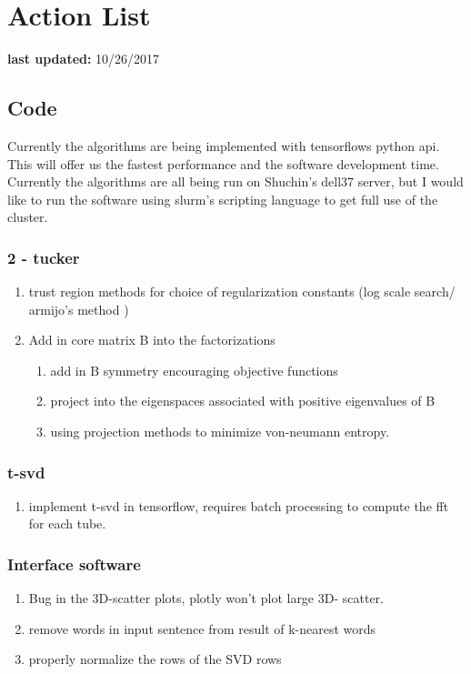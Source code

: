 \documentclass{report}
\begin{document}
\section{Action List}
	\textbf{last updated:} 10/26/2017
	\subsection{Code}
		Currently the algorithms are being implemented with tensorflows python api. This will offer us the fastest performance and the software development time. Currently the algorithms are all being run on Shuchin's dell37 server, but I would like to run the software using slurm's scripting language to get full use of the cluster. 
		\subsubsection{2 - tucker}
			\begin{enumerate}
				\item trust region methods for choice of regularization constants (log scale search/ armijo's method )
				\item Add in core matrix B into the factorizations
				\begin{enumerate}
					\item add in B symmetry encouraging objective functions
					\item project into the eigenspaces associated with positive eigenvalues of B
					\item using projection methods to minimize von-neumann entropy. 
				\end{enumerate}
			\end{enumerate}
		\subsubsection{t-svd}
			\begin{enumerate}
				\item implement t-svd in tensorflow, requires batch processing to compute the fft for each tube.  
			\end{enumerate}
		\subsubsection{Interface software}
		  \begin{enumerate}
		  	\item Bug in the 3D-scatter plots, plotly won't plot large 3D- scatter.
		  	\item remove words in input sentence from result of k-nearest words
		  	\item properly normalize the rows of the SVD rows 
		  \end{enumerate}
\end{document}
